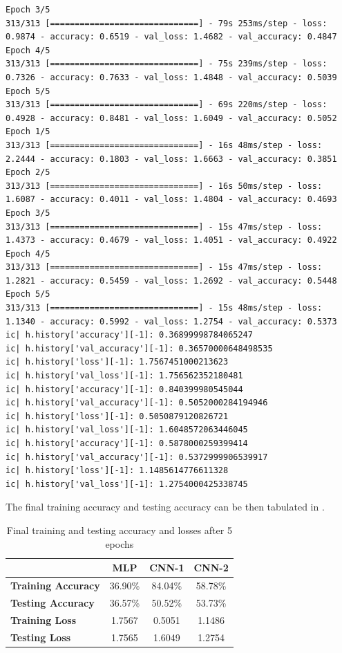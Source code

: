 \documentclass{tron}
\begin{document}
\begin{lstlisting}[style=mystyle:output, label=output:p3]
Epoch 3/5
313/313 [==============================] - 79s 253ms/step - loss: 0.9874 - accuracy: 0.6519 - val_loss: 1.4682 - val_accuracy: 0.4847
Epoch 4/5
313/313 [==============================] - 75s 239ms/step - loss: 0.7326 - accuracy: 0.7633 - val_loss: 1.4848 - val_accuracy: 0.5039
Epoch 5/5
313/313 [==============================] - 69s 220ms/step - loss: 0.4928 - accuracy: 0.8481 - val_loss: 1.6049 - val_accuracy: 0.5052
Epoch 1/5
313/313 [==============================] - 16s 48ms/step - loss: 2.2444 - accuracy: 0.1803 - val_loss: 1.6663 - val_accuracy: 0.3851
Epoch 2/5
313/313 [==============================] - 16s 50ms/step - loss: 1.6087 - accuracy: 0.4011 - val_loss: 1.4804 - val_accuracy: 0.4693
Epoch 3/5
313/313 [==============================] - 15s 47ms/step - loss: 1.4373 - accuracy: 0.4679 - val_loss: 1.4051 - val_accuracy: 0.4922
Epoch 4/5
313/313 [==============================] - 15s 47ms/step - loss: 1.2821 - accuracy: 0.5459 - val_loss: 1.2692 - val_accuracy: 0.5448
Epoch 5/5
313/313 [==============================] - 15s 48ms/step - loss: 1.1340 - accuracy: 0.5992 - val_loss: 1.2754 - val_accuracy: 0.5373
ic| h.history['accuracy'][-1]: 0.36899998784065247
ic| h.history['val_accuracy'][-1]: 0.36570000648498535
ic| h.history['loss'][-1]: 1.7567451000213623
ic| h.history['val_loss'][-1]: 1.756562352180481
ic| h.history['accuracy'][-1]: 0.840399980545044
ic| h.history['val_accuracy'][-1]: 0.5052000284194946
ic| h.history['loss'][-1]: 0.5050879120826721
ic| h.history['val_loss'][-1]: 1.6048572063446045
ic| h.history['accuracy'][-1]: 0.5878000259399414
ic| h.history['val_accuracy'][-1]: 0.5372999906539917
ic| h.history['loss'][-1]: 1.1485614776611328
ic| h.history['val_loss'][-1]: 1.2754000425338745
\end{lstlisting}

The final training accuracy and testing accuracy can be then tabulated in . 

\begin{table}[h!]
  \begin{center}
    \caption{Final training and testing accuracy and losses after 5 epochs}
    \label{table:p3:accuracy}
    \begin{tabular}{|l|c|c|c|}
      \hline 
      & \textbf{MLP} & \textbf{CNN-1} & \textbf{CNN-2}\\
      \hline 
      \hline 
      \textbf{Training Accuracy} & 36.90\% & 84.04\% & 58.78\% \\
      \hline 
      \textbf{Testing Accuracy} & 36.57\% & 50.52\% & 53.73\% \\
      \hline 
      \textbf{Training Loss} & 1.7567 & 0.5051 & 1.1486 \\
      \hline 
      \textbf{Testing Loss} & 1.7565 & 1.6049 & 1.2754 \\
      \hline 
      \hline 
    \end{tabular}
  \end{center}
\end{table}
\end{document}
